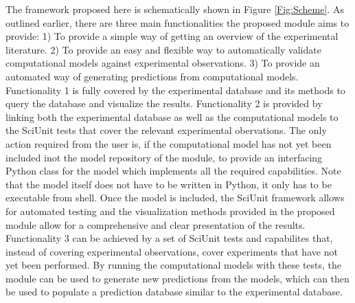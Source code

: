 \documentclass[a4paper,10pt]{article}
\begin{document}
The framework proposed here is schematically shown in Figure \ref{Fig:Scheme}. As outlined earlier, there are three main functionalities the proposed module aims to provide: 1) To provide a simple way of getting an overview
of the experimental literature. 2) To provide an easy and flexible way to automatically validate computational models against experimental observations. 3) To provide an automated way of generating predictions from computational
models. Functionality 1 is fully covered by the experimental database and its methods to query the database and visualize the results. Functionality 2 is provided by linking both the experimental database as well as the 
computational models to the SciUnit tests that cover the relevant experimental obervations. The only action required from the user is, if the computational model has not yet been included inot the model repository of the module, 
to provide an interfacing Python class for the model which implements all the required capabilities. Note that the model itself does not have to be written in Python, it only has to be executable from shell. Once the model is
included, the SciUnit framework allows for automated testing and the visualization methods provided in the proposed module allow for a comprehensive and clear presentation of the results. Functionality 3 can be achieved by
a set of SciUnit tests and capabilites that, instead of covering experimental observations, cover experiments that have not yet been performed. By running the computational models with these tests, 
the module can be used to generate new predictions from the models, which can then be used to populate a prediction database similar to the experimental database.
\end{document}
